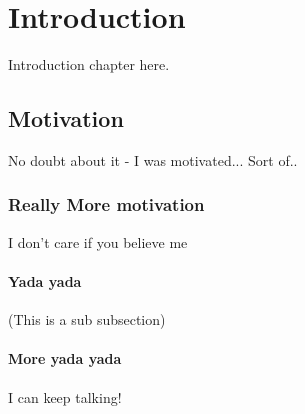 \chapter{Introduction}
Introduction chapter here. 

\section{Motivation}
No doubt about it - I was motivated... Sort of..

\subsection{Really More motivation}
I don't care if you believe me

\subsubsection{Yada yada}


(This is a sub subsection)

\subsubsection{More yada yada}

I can keep talking!


